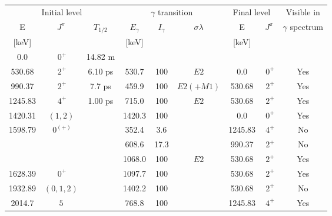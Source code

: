 \begin{tabular}{ccccccccc}
\hline
\multicolumn{3}{c}{Initial level} & \multicolumn{3}{c}{$\gamma$ transition}    & \multicolumn{2}{c}{Final level}  & Visible in        \\
E        & $J^\pi$    & $T_{1/2}$  & $E_\gamma$ & $I_\gamma$ & $\sigma \lambda$ & E               & $J^\pi$        & $\gamma$ spectrum \\
{[keV]}  &            &            & [keV]      &            &                  & [keV]           &                &                   \\
\hline
0.0      & $~0^+$     &   14.82 m  &            &            &                  &                 &                &                   \\
530.68   & $~2^+$     &    6.10 ps &  530.7     & 100        & $E2$             &    0.0          & $~0^+$         & Yes               \\
990.37   & $~2^+$     &    7.7 ps  &  459.9     & 100        & $E2(+M1)$        &  530.68         & $~2^+$         & Yes               \\
1245.83  & $~4^+$     &    1.00 ps &  715.0     & 100        & $E2$             &  530.68         & $~2^+$         & Yes               \\
1420.31  & $(1,2)$    &            & 1420.3     & 100        &                  &    0.0          & $~0^+$         & Yes               \\
1598.79  & $~0^{(+)}$ &            &  352.4     &   3.6      &                  & 1245.83         & $~4^+$         & No                \\
         &            &            &  608.6     &  17.3      &                  &  990.37         & $~2^+$         & No                \\
         &            &            & 1068.0     & 100        & $E2$             &  530.68         & $~2^+$         & Yes               \\
1628.39  & $~0^+$     &            & 1097.7     & 100        &                  &  530.68         & $~2^+$         & Yes               \\
1932.89  & $(0,1,2)$  &            & 1402.2     & 100        &                  &  530.68         & $~2^+$         & No                \\
2014.7   & $5$        &            &  768.8     & 100        &                  & 1245.83         & $~4^+$         & Yes               \\

\end{tabular}
